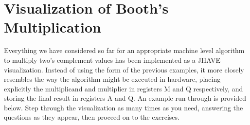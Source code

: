\documentclass{article}
\begin{document}
\section{Visualization of Booth's Multiplication}
Everything we have considered so far for an appropriate machine level algorithm to multiply two's complement values has been implemented as a JHAVE visualization.
Instead of using the form of the previous examples, it more closely resembles the way the algorithm might be executed in hardware, placing explicitly the multiplicand and multiplier in registers M and Q respectively, and storing the final result in registers A and Q.
An example run-through is provided below.
Step through the visualization as many times as you need, answering the questions as they appear, then proceed on to the exercises.


%
%
\end{document}
